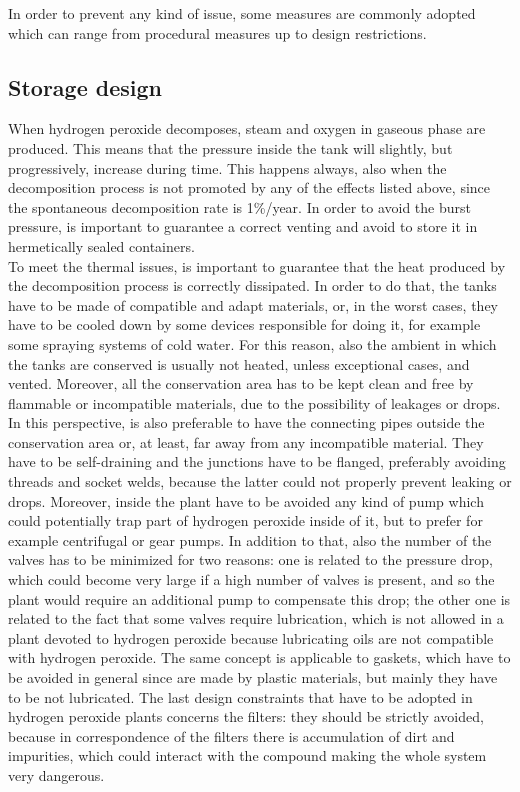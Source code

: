 \documentclass[a4paper]{report}
\begin{document}
In order to prevent any kind of issue, some measures are commonly adopted which can range from procedural measures up to design restrictions. \\

\subsection{Storage design}

When hydrogen peroxide decomposes, steam and oxygen in gaseous phase are produced. This means that the pressure inside the tank will slightly, but progressively, increase during time. This happens always, also when the decomposition process is not promoted by any of the effects listed above, since the spontaneous decomposition rate is 1\%/year. In order to avoid the burst pressure, is important to guarantee a correct venting and avoid to store it in hermetically sealed containers. \\
To meet the thermal issues, is important to guarantee that the heat produced by the decomposition process is correctly dissipated. In order to do that, the tanks have to be made of compatible and adapt materials, or, in the worst cases, they have to be cooled down by some devices responsible for doing it, for example some spraying systems of cold water. For this reason, also the ambient in which the tanks are conserved is usually not heated, unless exceptional cases, and vented. Moreover, all the conservation area has to be kept clean and free by flammable or incompatible materials, due to the possibility of leakages or drops. In this perspective, is also preferable to have the connecting pipes outside the conservation area or, at least, far away from any incompatible material. They have to be self-draining and the junctions have to be flanged, preferably avoiding threads and socket welds, because the latter could not properly prevent leaking or drops. Moreover, inside the plant have to be avoided any kind of pump which could potentially trap part of hydrogen peroxide inside of it, but to prefer for example centrifugal or gear pumps. In addition to that, also the number of the valves has to be minimized for two reasons: one is related to the pressure drop, which could become very large if a high number of valves is present, and so the plant would require an additional pump to compensate this drop; the other one is related to the fact that some valves require lubrication, which is not allowed in a plant devoted to hydrogen peroxide because lubricating oils are not compatible with hydrogen peroxide. The same concept is applicable to gaskets, which have to be avoided in general since are made by plastic materials, but mainly they have to be not lubricated. The last design constraints that have to be adopted in hydrogen peroxide plants concerns the filters: they should be strictly avoided, because in correspondence of the filters there is accumulation of dirt and impurities, which could interact with the compound making the whole system very dangerous. \\
\end{document}
